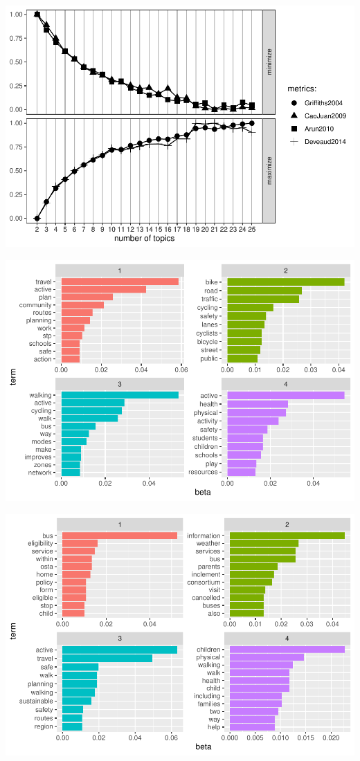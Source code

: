 \documentclass[]{elsarticle} %
\begin{document}
\includegraphics{AST-Framing-Ontario_files/figure-latex/evaluate-lda-5.pdf}

\includegraphics{AST-Framing-Ontario_files/figure-latex/municipal-terms-1.pdf}

\includegraphics{AST-Framing-Ontario_files/figure-latex/school-terms-1.pdf}
\end{document}
